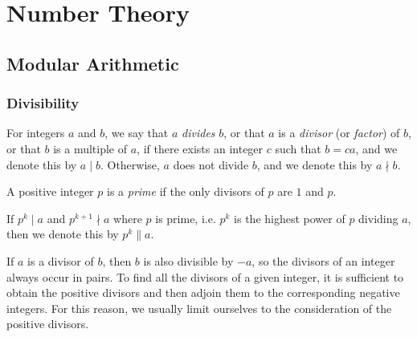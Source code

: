 \part{Number Theory}
\chapter{Modular Arithmetic}

\section{Divisibility}
\begin{definition}[Divisibility]
For integers $a$ and $b$, we say that $a$ \emph{divides} $b$, or that $a$ is a \emph{divisor} (or \emph{factor}) of $b$, or that $b$ is a multiple of $a$, if there exists an integer $c$ such that $b=ca$, and we denote this by $a\mid b$. Otherwise, $a$ does not divide $b$, and we denote this by $a\nmid b$.
\end{definition}

\begin{definition}[Prime]
A positive integer $p$ is a \emph{prime} if the only divisors of $p$ are $1$ and $p$.

If $p^k\mid a$ and $p^{k+1}\nmid a$ where $p$ is prime, i.e. $p^k$ is the highest power of $p$ dividing $a$, then we denote this by $p^k\parallel a$.
\end{definition}

\begin{remark}
If $a$ is a divisor of $b$, then $b$ is also divisible by $-a$, so the divisors of an integer always occur in pairs. To find all the divisors of a given integer, it is sufficient to obtain the positive divisors and then adjoin them to the corresponding negative integers. For this reason, we usually limit ourselves to the consideration of the positive divisors.
\end{remark}

